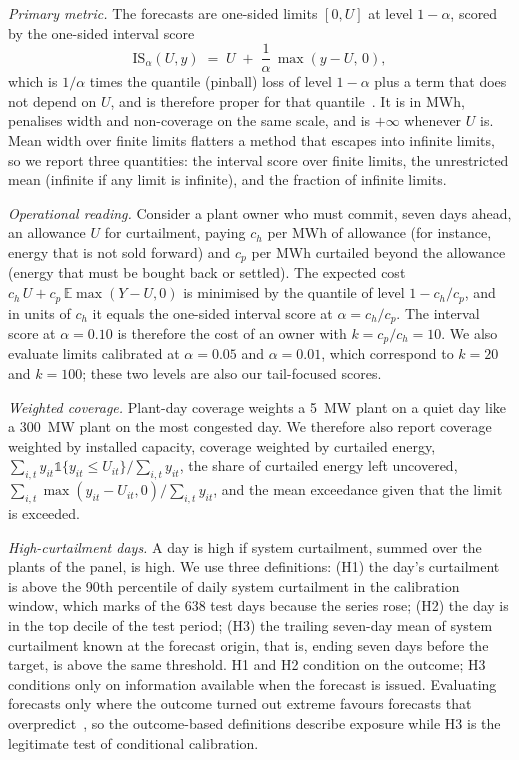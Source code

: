 \emph{Primary metric.} The forecasts are one-sided limits $[0,U]$ at level $1-\alpha$, scored by the one-sided interval score
\begin{equation}
\mathrm{IS}_\alpha(U,y) \;=\; U \;+\; \frac{1}{\alpha}\,\max(y-U,\,0),
\label{eq:is}
\end{equation}
which is $1/\alpha$ times the quantile (pinball) loss of level $1-\alpha$ plus a term that does not depend on $U$, and is therefore proper for that quantile~\cite{gneiting2007}. It is in MWh, penalises width and non-coverage on the same scale, and is $+\infty$ whenever $U$ is. Mean width over finite limits flatters a method that escapes into infinite limits, so we report three quantities: the interval score over finite limits, the unrestricted mean (infinite if any limit is infinite), and the fraction of infinite limits.

\emph{Operational reading.} Consider a plant owner who must commit, seven days ahead, an allowance $U$ for curtailment, paying $c_h$ per MWh of allowance (for instance, energy that is not sold forward) and $c_p$ per MWh curtailed beyond the allowance (energy that must be bought back or settled). The expected cost $c_h\,U+c_p\,\mathbb{E}\max(Y-U,0)$ is minimised by the quantile of level $1-c_h/c_p$, and in units of $c_h$ it equals the one-sided interval score at $\alpha=c_h/c_p$. The interval score at $\alpha=0.10$ is therefore the cost of an owner with $k=c_p/c_h=10$. We also evaluate limits calibrated at $\alpha=0.05$ and $\alpha=0.01$, which correspond to $k=20$ and $k=100$; these two levels are also our tail-focused scores.

\emph{Weighted coverage.} Plant-day coverage weights a 5~MW plant on a quiet day like a 300~MW plant on the most congested day. We therefore also report coverage weighted by installed capacity, coverage weighted by curtailed energy, $\sum_{i,t} y_{it}\mathbb{1}\{y_{it}\le U_{it}\}/\sum_{i,t} y_{it}$, the share of curtailed energy left uncovered, $\sum_{i,t}\max(y_{it}-U_{it},0)/\sum_{i,t}y_{it}$, and the mean exceedance given that the limit is exceeded.

\emph{High-curtailment days.} A day is high if system curtailment, summed over the plants of the panel, is high. We use three definitions: (H1) the day's curtailment is above the 90th percentile of daily system curtailment in the calibration window, which marks  of the 638 test days because the series rose; (H2) the day is in the top decile of the test period; (H3) the trailing seven-day mean of system curtailment known at the forecast origin, that is, ending seven days before the target, is above the same threshold. H1 and H2 condition on the outcome; H3 conditions only on information available when the forecast is issued. Evaluating forecasts only where the outcome turned out extreme favours forecasts that overpredict~\cite{lerch2017}, so the outcome-based definitions describe exposure while H3 is the legitimate test of conditional calibration.

